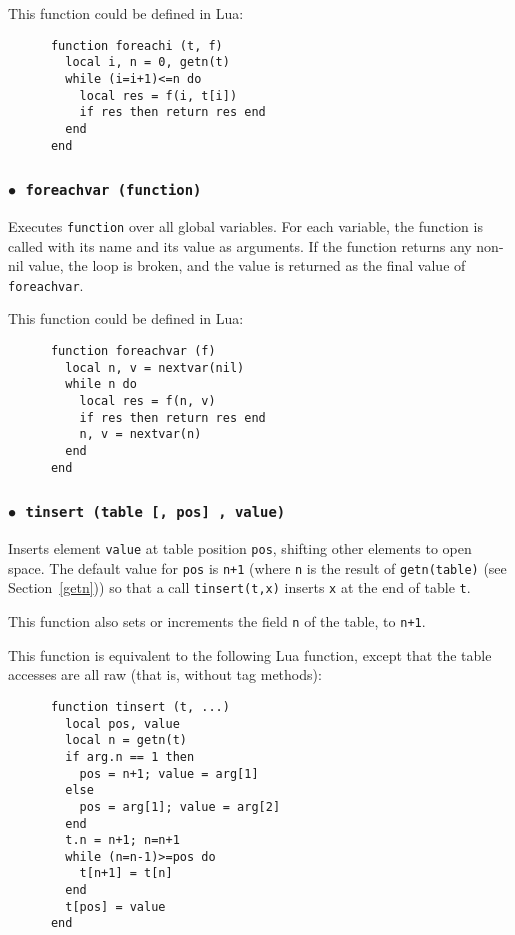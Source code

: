 \documentclass[11pt]{article}
\newcommand{\See}[1]{Section~\ref{#1}}
\newcommand{\see}[1]{(see \See{#1})}
\newcommand{\T}[1]{{\tt #1}}
\newcommand{\Deffunc}[1]{\index{#1}}
\newcommand{\ff}{$\bullet$\ }
\begin{document}
This function could be defined in Lua:
\begin{verbatim}
      function foreachi (t, f)
        local i, n = 0, getn(t)
        while (i=i+1)<=n do
          local res = f(i, t[i])
          if res then return res end
        end
      end
\end{verbatim}

\subsubsection*{\ff \T{foreachvar (function)}}\Deffunc{foreachvar}
Executes \verb|function| over all global variables.
For each variable,
the function is called with its name and its value as arguments.
If the function returns any non-nil value,
the loop is broken, and the value is returned
as the final value of \verb|foreachvar|.

This function could be defined in Lua:
\begin{verbatim}
      function foreachvar (f)
        local n, v = nextvar(nil)
        while n do
          local res = f(n, v)
          if res then return res end
          n, v = nextvar(n)
        end
      end
\end{verbatim}

\subsubsection*{\ff \T{tinsert (table [, pos] , value)}}\Deffunc{tinsert}

Inserts element \verb|value| at table position \verb|pos|,
shifting other elements to open space.
The default value for \verb|pos| is \verb|n+1|
(where \verb|n| is the result of \verb|getn(table)| \see{getn})
so that a call \verb|tinsert(t,x)| inserts \verb|x| at the end
of table \verb|t|.

This function also sets or increments the field \verb|n| of the table,
to \verb|n+1|.

This function is equivalent to the following Lua function,
except that the table accesses are all raw (that is, without tag methods):
\begin{verbatim}
      function tinsert (t, ...)
        local pos, value
        local n = getn(t)
        if arg.n == 1 then
          pos = n+1; value = arg[1]
        else
          pos = arg[1]; value = arg[2]
        end
        t.n = n+1; n=n+1
        while (n=n-1)>=pos do
          t[n+1] = t[n]
        end
        t[pos] = value
      end
\end{verbatim}
\end{document}
